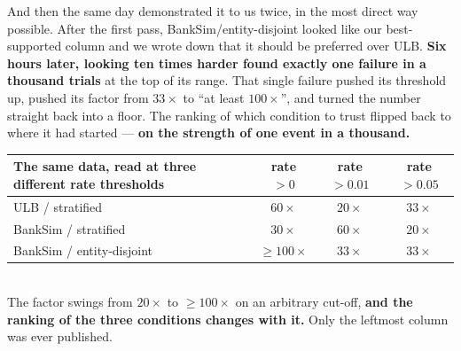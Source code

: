 \documentclass[11pt]{article}
\begin{document}
And then the same day demonstrated it to us twice, in the most direct way possible. After the first
pass, BankSim/entity-disjoint looked like our best-supported column and we wrote down that it should be
preferred over ULB. \textbf{Six hours later, looking ten times harder found exactly one failure in a
thousand trials} at the top of its range. That single failure pushed its threshold up, pushed its factor
from $33\times$ to ``at least $100\times$'', and turned the number straight back into a floor. The
ranking of which condition to trust flipped back to where it had started --- \textbf{on the strength of
one event in a thousand.}

\begin{center}\small
\begin{tabularx}{\linewidth}{@{}X c c c@{}}
\toprule
\textbf{The same data, read at three different rate thresholds} & \textbf{rate $>0$} & \textbf{rate $>0.01$} & \textbf{rate $>0.05$} \\
\midrule
ULB / stratified & $60\times$ & $20\times$ & $33\times$ \\
BankSim / stratified & $30\times$ & $60\times$ & $20\times$ \\
BankSim / entity-disjoint & $\ge100\times$ & $33\times$ & $33\times$ \\
\bottomrule
\end{tabularx}\\[3pt]
{\footnotesize The factor swings from $20\times$ to $\ge100\times$ on an arbitrary cut-off,
\textbf{and the ranking of the three conditions changes with it.} Only the leftmost column was ever
published.}
\end{center}
\end{document}

